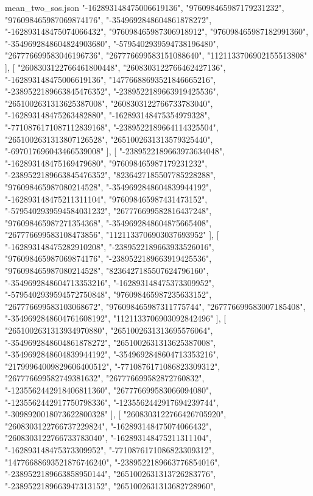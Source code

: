 \begin{filecontents*}[overwrite]{mean_two_sos.json}
    "-162893148475006619136",
    "976098465987179231232",
    "976098465987069874176",
    "-3549692848604861878272",
    "-162893148475074066432",
    "976098465987306918912",
    "976098465987182991360",
    "-3549692848604824903680",
    "-5795402939594738196480",
    "267776699583046196736",
    "267776699583151088640",
    "1121133706902155513808"
   ],
   [
    "2608303122766461800448",
    "2608303122766462427136",
    "-162893148475006619136",
    "14776688693521846665216",
    "-2389522189663845476352",
    "-2389522189663919425536",
    "2651002631313625387008",
    "2608303122766733783040",
    "-162893148475263482880",
    "-162893148475354979328",
    "-7710876171087112839168",
    "-2389522189664114325504",
    "2651002631313807126528",
    "2651002631313579325440",
    "-697017696043466539008"
   ],
   [
    "-2389522189663973634048",
    "-162893148475169479680",
    "976098465987179231232",
    "-2389522189663845476352",
    "8236427185507785228288",
    "976098465987080214528",
    "-3549692848604839944192",
    "-162893148475211311104",
    "976098465987431473152",
    "-5795402939594584031232",
    "267776699582816437248",
    "976098465987271354368",
    "-3549692848604875665408",
    "267776699583108473856",
    "1121133706903037693952"
   ],
   [
    "-162893148475282910208",
    "-2389522189663933526016",
    "976098465987069874176",
    "-2389522189663919425536",
    "976098465987080214528",
    "8236427185507624796160",
    "-3549692848604713353216",
    "-162893148475373309952",
    "-5795402939594572750848",
    "976098465987235633152",
    "267776699583103068672",
    "976098465987311775744",
    "267776699583007185408",
    "-3549692848604761608192",
    "1121133706903092842496"
   ],
   [
    "2651002631313934970880",
    "2651002631313695576064",
    "-3549692848604861878272",
    "2651002631313625387008",
    "-3549692848604839944192",
    "-3549692848604713353216",
    "21799964009829606400512",
    "-7710876171086823309312",
    "267776699582749381632",
    "267776699582872760832",
    "-1235562442918406811360",
    "267776699583066094080",
    "-1235562442917750798336",
    "-1235562442917694239744",
    "-3098920018073622800328"
   ],
   [
    "2608303122766426705920",
    "2608303122766737229824",
    "-162893148475074066432",
    "2608303122766733783040",
    "-162893148475211311104",
    "-162893148475373309952",
    "-7710876171086823309312",
    "14776688693521876746240",
    "-2389522189663776854016",
    "-2389522189663858950144",
    "2651002631313726283776",
    "-2389522189663947313152",
    "2651002631313682728960",

\end{filecontents*}
